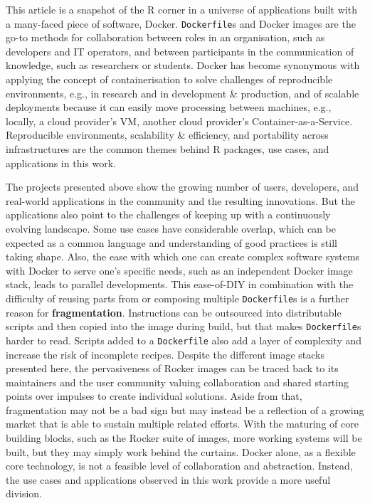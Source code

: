 This article is a snapshot of the R corner in a universe of applications
built with a many-faced piece of software, Docker. \texttt{Dockerfile}s
and Docker images are the go-to methods for collaboration between roles
in an organisation, such as developers and IT operators, and between
participants in the communication of knowledge, such as researchers or
students. Docker has become synonymous with applying the concept of
containerisation to solve challenges of reproducible environments, e.g.,
in research and in development \& production, and of scalable
deployments because it can easily move processing between machines,
e.g., locally, a cloud provider's VM, another cloud provider's
Container-as-a-Service. Reproducible environments, scalability \&
efficiency, and portability across infrastructures are the common themes
behind R packages, use cases, and applications in this work.

The projects presented above show the growing number of users,
developers, and real-world applications in the community and the
resulting innovations. But the applications also point to the challenges
of keeping up with a continuously evolving landscape. Some use cases
have considerable overlap, which can be expected as a common language
and understanding of good practices is still taking shape. Also, the
ease with which one can create complex software systems with Docker to
serve one's specific needs, such as an independent Docker image stack,
leads to parallel developments. This ease-of-DIY in combination with the
difficulty of reusing parts from or composing multiple
\texttt{Dockerfile}s is a further reason for \textbf{fragmentation}.
Instructions can be outsourced into distributable scripts and then
copied into the image during build, but that makes \texttt{Dockerfile}s
harder to read. Scripts added to a \texttt{Dockerfile} also add a layer
of complexity and increase the risk of incomplete recipes. Despite the
different image stacks presented here, the pervasiveness of Rocker
images can be traced back to its maintainers and the user community
valuing collaboration and shared starting points over impulses to create
individual solutions. Aside from that, fragmentation may not be a bad
sign but may instead be a reflection of a growing market that is able to
sustain multiple related efforts. With the maturing of core building
blocks, such as the Rocker suite of images, more working systems will be
built, but they may simply work behind the curtains. Docker alone, as a
flexible core technology, is not a feasible level of collaboration and
abstraction. Instead, the use cases and applications observed in this
work provide a more useful division.

